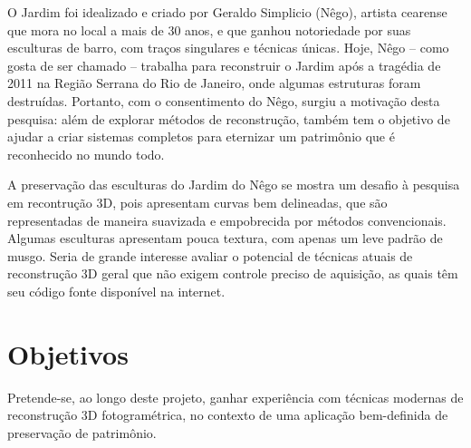 

O Jardim foi idealizado e criado por Geraldo Simplicio (Nêgo), artista cearense que mora no
local a mais de 30 anos, e que ganhou notoriedade por suas esculturas de barro,
com traços singulares e técnicas únicas. Hoje, Nêgo -- como gosta de ser chamado
-- trabalha para reconstruir o Jardim após a tragédia de 2011 na Região Serrana
do Rio de Janeiro, onde algumas estruturas foram destruídas. Portanto, com o
consentimento do Nêgo, surgiu a motivação desta pesquisa: além de explorar
métodos de reconstrução, também tem o objetivo de ajudar a criar sistemas
completos para eternizar um patrimônio que é reconhecido no mundo todo.

A preservação das esculturas do Jardim do Nêgo se mostra um desafio à pesquisa em
recontrução 3D, pois apresentam curvas bem delineadas, que são 
representadas de maneira suavizada e empobrecida por métodos convencionais.
Algumas esculturas apresentam pouca textura, com apenas um leve padrão de musgo.
Seria de grande interesse avaliar o potencial de técnicas atuais de
reconstrução 3D geral que não exigem controle preciso de aquisição, as quais têm seu código fonte
disponível na internet.

\newpage

\section{Objetivos}\label{sec:objetivos}

Pretende-se, ao longo deste projeto, ganhar experiência com técnicas
modernas de reconstrução 3D fotogramétrica, no contexto de uma aplicação
bem-definida de preservação de patrimônio. 

